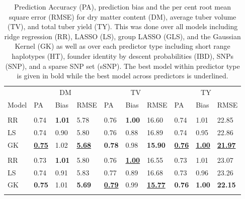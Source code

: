 \begin{refsection}
\begin{table}
\caption{\label{tbl-summaries}Prediction Accuracy (PA), prediction bias and the per cent root mean
square error (RMSE) for dry matter content (DM), average tuber volume
(TV), and total tuber yield (TY). This was done over all models
including ridge regression (RR), LASSO (LS), group LASSO (GLS), and the
Gaussian Kernel (GK) as well as over each predictor type including short
range haplotypes (HT), founder identity by descent probabilities (IBD),
SNPs (SNP), and a sparse SNP set (sSNP). The best model within predictor
type is given in bold while the best model across predictors is
underlined. }\tabularnewline

\centering
\begin{tabular}{llllllllll}
\toprule
\multicolumn{1}{c}{ } & \multicolumn{3}{c}{DM} & \multicolumn{3}{c}{TV} & \multicolumn{3}{c}{TY} \\
\cmidrule(l{3pt}r{3pt}){2-4} \cmidrule(l{3pt}r{3pt}){5-7} \cmidrule(l{3pt}r{3pt}){8-10}
Model & PA & Bias & RMSE & PA & Bias & RMSE & PA & Bias & RMSE\\
\midrule
\addlinespace[0.3em]
\multicolumn{10}{l}{\textbf{SNP}}\\
\hspace{1em}RR & 0.74 & \textbf{1.01} & 5.78 & 0.76 & \textbf{1.00} & 16.60 & 0.74 & 1.01 & 22.85\\
\hspace{1em}LS & 0.74 & 0.90 & 5.80 & 0.76 & 0.88 & 16.89 & 0.74 & 0.95 & 22.86\\
\hspace{1em}GK & \underline{\textbf{0.75}} & 1.02 & \underline{\textbf{5.68}} & \textbf{0.78} & 0.98 & \textbf{15.90} & \underline{\textbf{0.76}} & \underline{\textbf{1.00}} & \underline{\textbf{21.97}}\\
\addlinespace[0.3em]
\multicolumn{10}{l}{\textbf{sSNP}}\\
\hspace{1em}RR & 0.73 & \textbf{1.01} & 5.80 & 0.76 & \underline{\textbf{1.00}} & 16.55 & 0.73 & 1.01 & 23.07\\
\hspace{1em}LS & 0.74 & 0.91 & 5.83 & 0.77 & 0.89 & 16.68 & 0.73 & 0.96 & 23.26\\
\hspace{1em}GK & \textbf{0.75} & 1.01 & \textbf{5.69} & \underline{\textbf{0.79}} & 0.99 & \underline{\textbf{15.77}} & \textbf{0.76} & \textbf{1.00} & \textbf{22.15}\\
\addlinespace[0.3em]
\multicolumn{10}{l}{\textbf{HT}}\\

\end{tabular}
\end{table}
\end{refsection}
